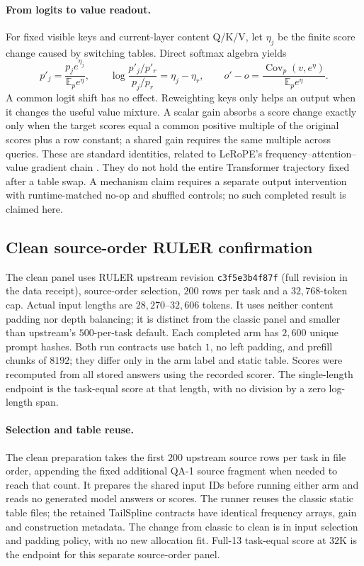 \paragraph{From logits to value readout.}
For fixed visible keys and current-layer content Q/K/V, let $\eta_j$ be the
finite score change caused by switching tables. Direct softmax algebra yields
\begin{equation}
p'_j=\frac{p_j e^{\eta_j}}{\mathbb E_p e^\eta},\qquad
\log\frac{p'_j/p'_r}{p_j/p_r}=\eta_j-\eta_r,\qquad
o'-o=\frac{\operatorname{Cov}_p(v,e^\eta)}{\mathbb E_p e^\eta}.
\label{eq:finite-readout}
\end{equation}
A common logit shift has no effect. Reweighting keys only helps an output when
it changes the useful value mixture. A scalar gain absorbs a score change
exactly only when the target scores equal a common positive multiple of the
original scores plus a row constant; a shared gain requires the same multiple
across queries. These are standard identities, related to LeRoPE's
frequency--attention--value gradient chain \citep{karypis2026lerope}.
They do not hold the entire Transformer trajectory fixed after a table swap.
A mechanism claim requires a separate output intervention with runtime-matched
no-op and shuffled controls; no such completed result is claimed here.

\subsection{Clean source-order RULER confirmation}
\label{sec:clean-confirmation}
The clean panel uses RULER upstream revision
\texttt{c3f5e3b4f87f} (full revision in the data receipt), source-order selection,
$200$ rows per task and a $32{,}768$-token cap. Actual input lengths are
$28{,}270$--$32{,}606$ tokens. It uses neither content padding nor depth
balancing; it is distinct from the classic panel and smaller than upstream's
$500$-per-task default. Each completed arm has $2{,}600$ unique prompt hashes.
Both run contracts use batch $1$, no left padding, and prefill chunks of $8192$;
they differ only in the arm label and static table. Scores were recomputed from
all stored answers using the recorded scorer. The single-length endpoint is
the task-equal score at that length, with no division by a zero log-length span.

\paragraph{Selection and table reuse.}
The clean preparation takes the first $200$ upstream source rows per task in file order, appending the fixed additional QA-1 source fragment when needed to reach that count. It prepares the shared input IDs before running either arm and reads no generated model answers or scores. The runner reuses the classic static table files; the retained TailSpline contracts have identical frequency arrays, gain and construction metadata. The change from classic to clean is in input selection and padding policy, with no new allocation fit. Full-13 task-equal score at $32$K is the endpoint for this separate source-order panel.

